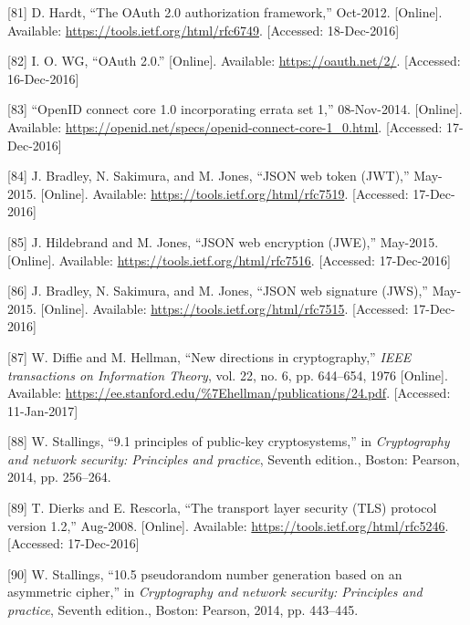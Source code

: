 \documentclass[12pt,english,a4paper,titlepage,cleardoublepage=empty,dottedtoc]{report}
\begin{document}
\hypertarget{ref-web_spec_oauth-2}{}
{[}81{]} D. Hardt, ``The OAuth 2.0 authorization framework,'' Oct-2012.
{[}Online{]}. Available: \url{https://tools.ietf.org/html/rfc6749}.
{[}Accessed: 18-Dec-2016{]}

\hypertarget{ref-web_2016_oauth-2}{}
{[}82{]} I. O. WG, ``OAuth 2.0.'' {[}Online{]}. Available:
\url{https://oauth.net/2/}. {[}Accessed: 16-Dec-2016{]}

\hypertarget{ref-web_spec_openid-connect-1}{}
{[}83{]} ``OpenID connect core 1.0 incorporating errata set 1,''
08-Nov-2014. {[}Online{]}. Available:
\url{https://openid.net/specs/openid-connect-core-1_0.html}.
{[}Accessed: 17-Dec-2016{]}

\hypertarget{ref-web_spec_json-web-token}{}
{[}84{]} J. Bradley, N. Sakimura, and M. Jones, ``JSON web token
(JWT),'' May-2015. {[}Online{]}. Available:
\url{https://tools.ietf.org/html/rfc7519}. {[}Accessed: 17-Dec-2016{]}

\hypertarget{ref-web_spec_json-web-encryption}{}
{[}85{]} J. Hildebrand and M. Jones, ``JSON web encryption (JWE),''
May-2015. {[}Online{]}. Available:
\url{https://tools.ietf.org/html/rfc7516}. {[}Accessed: 17-Dec-2016{]}

\hypertarget{ref-web_spec_json-web-signature}{}
{[}86{]} J. Bradley, N. Sakimura, and M. Jones, ``JSON web signature
(JWS),'' May-2015. {[}Online{]}. Available:
\url{https://tools.ietf.org/html/rfc7515}. {[}Accessed: 17-Dec-2016{]}

\hypertarget{ref-paper_1976_d-h-key-exchange}{}
{[}87{]} W. Diffie and M. Hellman, ``New directions in cryptography,''
\emph{IEEE transactions on Information Theory}, vol. 22, no. 6, pp.
644--654, 1976 {[}Online{]}. Available:
\url{https://ee.stanford.edu/\%7Ehellman/publications/24.pdf}.
{[}Accessed: 11-Jan-2017{]}

\hypertarget{ref-book_2014_chapter-9-1-public-key-crypto}{}
{[}88{]} W. Stallings, ``9.1 principles of public-key cryptosystems,''
in \emph{Cryptography and network security: Principles and practice},
Seventh edition., Boston: Pearson, 2014, pp. 256--264.

\hypertarget{ref-web_spec_tls}{}
{[}89{]} T. Dierks and E. Rescorla, ``The transport layer security (TLS)
protocol version 1.2,'' Aug-2008. {[}Online{]}. Available:
\url{https://tools.ietf.org/html/rfc5246}. {[}Accessed: 17-Dec-2016{]}

\hypertarget{ref-book_2014_chapter-14-5-pki}{}
{[}90{]} W. Stallings, ``10.5 pseudorandom number generation based on an
asymmetric cipher,'' in \emph{Cryptography and network security:
Principles and practice}, Seventh edition., Boston: Pearson, 2014, pp.
443--445.
\end{document}
